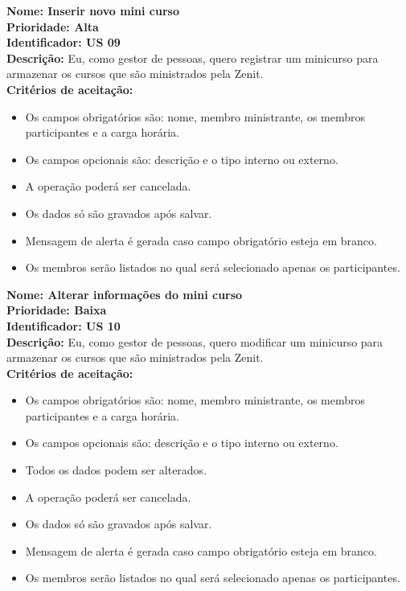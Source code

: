 \begin{anexosenv}
\indent \textbf{Nome: Inserir novo mini curso\\
\indent Prioridade: Alta\\
\indent Identificador: US 09\\
\indent Descrição: }Eu, como gestor de pessoas, quero registrar um minicurso para armazenar os cursos que são ministrados pela Zenit.\\
\indent \textbf{Critérios de aceitação:}
\begin{itemize}
    \item Os campos obrigatórios são: nome, membro ministrante, os membros participantes e a carga horária.
    \item Os campos opcionais são: descrição e o tipo interno ou externo.
    \item A operação poderá ser cancelada.
    \item Os dados só são gravados após salvar.
    \item Mensagem de alerta é gerada caso campo obrigatório esteja em branco.
    \item Os membros serão listados no qual será selecionado apenas os participantes.
\end{itemize}

\indent \textbf{Nome: Alterar informações do mini curso\\
\indent Prioridade: Baixa\\
\indent Identificador: US 10\\
\indent Descrição:} Eu, como gestor de pessoas, quero modificar um minicurso para armazenar os cursos que são ministrados pela Zenit.\\
\indent \textbf{Critérios de aceitação:}
\begin{itemize}
    \item Os campos obrigatórios são: nome, membro ministrante, os membros participantes e a carga horária.
    \item Os campos opcionais são: descrição e o tipo interno ou externo.
    \item Todos os dados podem ser alterados.
    \item A operação poderá ser cancelada.
    \item Os dados só são gravados após salvar.
    \item Mensagem de alerta é gerada caso campo obrigatório esteja em branco.
    \item Os membros serão listados no qual será selecionado apenas os participantes.
\end{itemize}


\end{anexosenv}
